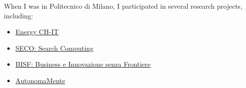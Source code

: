 When I was in Politecnico di Milano, I participated in several research
projects, including:

\begin{itemize}
\tightlist
\item
  \href{http://www.fondazionepolitecnico.it/it/cosa-facciamo/progetti-di-innovazione/item/energy-ch-it-distretto-per-le-tecnologie-e-i-materiali-per-l-efficienza-energetica-dell-insubria}{Energy
  CH-IT}
\item
  \href{https://cordis.europa.eu/project/rcn/88591/factsheet/en}{SECO:
  Search Computing}
\item
  \href{http://www.fondazionepolitecnico.it/it/cosa-facciamo/progetti-di-innovazione/item/bisf-business-e-innovazione-senza-frontiere}{BISF:
  Business e Innovazione senza Frontiere}
\item
  \href{http://autonomamente.como.polimi.it/index85f3.html?option=com_content\&task=view\&id=15\&Itemid=16}{AutonomaMente}
\end{itemize}
